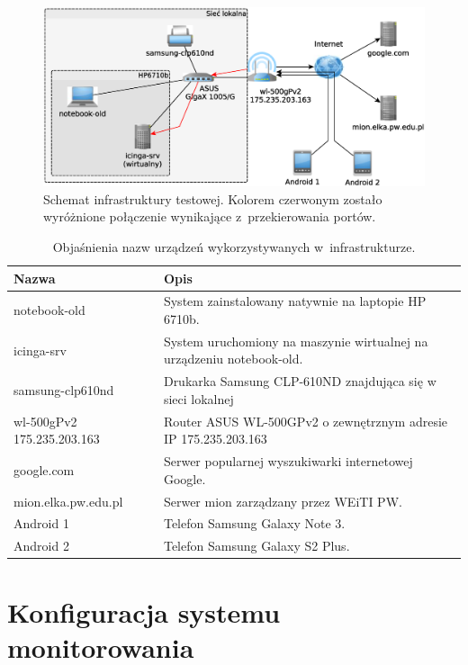 \begin{figure}[ht]
  \caption{Schemat infrastruktury testowej. Kolorem czerwonym zostało
    wyróżnione połączenie wynikające z~przekierowania portów.}
  \label{fig:schematSieci}
  \centering
\includegraphics[width=1\textwidth]{img/schematSieci}
\end{figure}

\begin{table}
\centering
\caption{Objaśnienia nazw urządzeń wykorzystywanych w~infrastrukturze.}
\label{tab:devices}
\begin{tabular}{|p{4cm}||p{10cm}|}
  \hline
  Nazwa & Opis \\
  \hline \hline
  notebook-old & System zainstalowany natywnie na laptopie HP 6710b. \\
  \hline
  icinga-srv & System uruchomiony na maszynie wirtualnej na urządzeniu notebook-old. \\
  \hline
  samsung-clp610nd & Drukarka Samsung CLP-610ND znajdująca się w sieci lokalnej \\
  \hline
  \raggedright{wl-500gPv2 175.235.203.163} & \raggedright{Router ASUS WL-500GPv2 o zewnętrznym adresie IP 175.235.203.163}
  \tabularnewline
  \hline
  google.com & Serwer popularnej wyszukiwarki internetowej Google. \\
  \hline
  mion.elka.pw.edu.pl & Serwer mion zarządzany przez WEiTI PW. \\
  \hline
  Android 1 & Telefon Samsung Galaxy Note 3. \\
  \hline
  Android 2 & Telefon Samsung Galaxy S2 Plus. \\
  \hline
\end{tabular}
\end{table}

\section[Konfiguracja systemu monitorowania][Konfiguracja systemu
monitorowania]{Konfiguracja systemu monitorowania}

